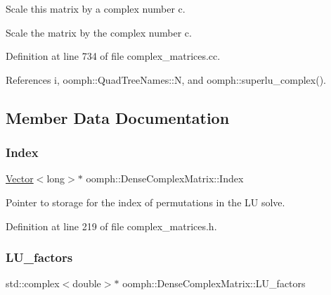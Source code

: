 Scale this matrix by a complex number c. 

Scale the matrix by the complex number c. 

Definition at line 734 of file complex\+\_\+matrices.\+cc.



References i, oomph\+::\+Quad\+Tree\+Names\+::N, and oomph\+::superlu\+\_\+complex().



\subsection{Member Data Documentation}
\mbox{\label{classoomph_1_1DenseComplexMatrix_a477e3c52ed0b3bca35213d12f615050d}} 
\subsubsection{\texorpdfstring{Index}{Index}}
{\footnotesize\ttfamily \hyperlink{classoomph_1_1Vector}{Vector}$<$long$>$$\ast$ oomph\+::\+Dense\+Complex\+Matrix\+::\+Index\hspace{0.3cm}{\ttfamily [private]}}



Pointer to storage for the index of permutations in the LU solve. 



Definition at line 219 of file complex\+\_\+matrices.\+h.

\mbox{\label{classoomph_1_1DenseComplexMatrix_ae14fa899e9257ee36e4d251502886f25}} 
\subsubsection{\texorpdfstring{L\+U\+\_\+factors}{LU\_factors}}
{\footnotesize\ttfamily std\+::complex$<$double$>$$\ast$ oomph\+::\+Dense\+Complex\+Matrix\+::\+L\+U\+\_\+factors\hspace{0.3cm}{\ttfamily [private]}}



